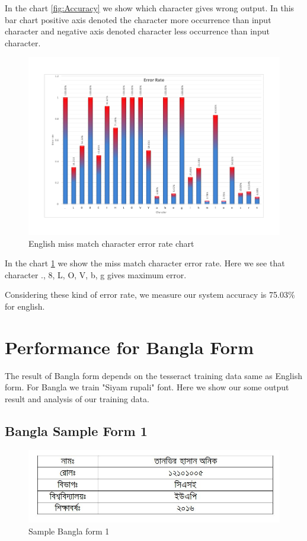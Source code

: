 In the chart \ref{fig:Accuracy} we show which character gives wrong output. In this bar chart positive axis denoted the character more occurrence than input character and negative axis denoted character less occurrence than input character.

\begin{figure}[H]
\centering
\includegraphics[width=1\textwidth]{EError.pdf}
\caption {English miss match character error rate chart}
\label {fig:Eerror}
\end{figure}

In the chart \ref{fig:Eerror} we show the miss match character error rate. Here we see that character ., 8, L, O, V, b, g gives maximum error.

Considering these kind of error rate, we measure our system accuracy is 75.03\% for english.
\newpage

\section{Performance for Bangla Form}
The result of Bangla form depends on the tesseract training data same as English form. For Bangla we train "Siyam rupali" font. Here we show our some output result and analysis of our training data.
\subsection{Bangla Sample Form 1}
\begin{figure}[H]
\centering
\includegraphics[width=1\textwidth]{formBen01.JPG}
\caption {Sample Bangla form 1}
\label {fig:FormBan1}
\end{figure}

